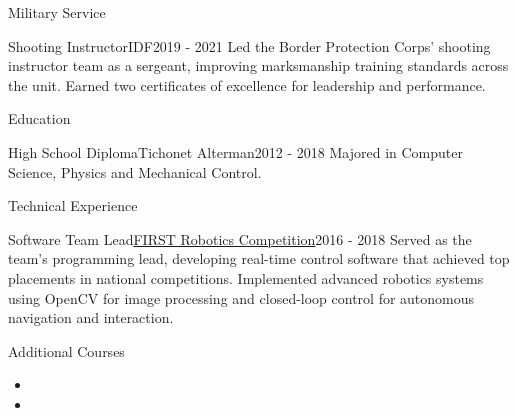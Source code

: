 \documentclass[]{mcdowellcv}
\begin{document}
	\begin{cvsection}{Military Service}
		\begin{cvsubsection}{Shooting Instructor}{IDF}{2019 - 2021}
			Led the Border Protection Corps’ shooting instructor team as a sergeant, improving marksmanship training standards across the unit. Earned two certificates of excellence for leadership and performance.
		\end{cvsubsection}
	\end{cvsection}
	
	\begin{cvsection}{Education}
		\begin{cvsubsection}{High School Diploma}{Tichonet Alterman}{2012 - 2018}
			Majored in Computer Science, Physics and Mechanical Control.
		\end{cvsubsection}
	\end{cvsection}
	
	\begin{cvsection}{Technical Experience}
		\begin{cvsubsection}{Software Team Lead}{\href{https://www.firstinspires.org/robotics/frc/what-is-first-robotics-competition}{FIRST Robotics Competition}}{2016 - 2018}	
			Served as the team’s programming lead, developing real-time control software that achieved top placements in national competitions. Implemented advanced robotics systems using OpenCV for image processing and \linebreak closed-loop control for autonomous navigation and interaction.
		\end{cvsubsection}
	\end{cvsection}

	\begin{cvsection}{Additional Courses}
		\begin{cvsubsection}{}{}{}	
			\begin{itemize}
				\item {}
				\item {}
			\end{itemize}
		\end{cvsubsection}
	\end{cvsection}
	
\end{document}
